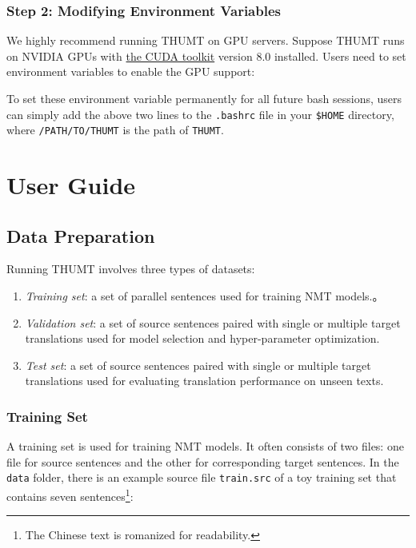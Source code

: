 \documentclass{article}
\begin{document}
\subsubsection{Step 2: Modifying Environment Variables}
We highly recommend running THUMT on GPU servers. Suppose THUMT runs on NVIDIA GPUs with \href{https://developer.nvidia.com/cuda-toolkit}{the CUDA toolkit} version 8.0 installed. Users need to set environment variables to enable the GPU support:

To set these environment variable permanently for all future bash sessions, users can simply add the above two lines to the \verb|.bashrc| file in your \verb|$HOME| directory, where \verb|/PATH/TO/THUMT| is the path of \verb|THUMT|.

\section{User Guide}

\subsection{Data Preparation}
Running THUMT involves three types of datasets:

\begin{enumerate}
\item {\em Training set}: a set of parallel sentences used for training NMT models.。
\item {\em Validation set}: a set of source sentences paired with single or multiple target translations used for model selection and hyper-parameter optimization.
\item {\em Test set}: a set of source sentences paired with single or multiple target translations used for evaluating translation performance on unseen texts.
\end{enumerate}

\subsubsection{Training Set}
A training set is used for training NMT models. It often consists of two files: one file for source sentences and the other for corresponding target sentences. In the \verb|data| folder, there is an example source file \verb|train.src| of a toy training set that contains seven sentences\footnote{The Chinese text is romanized for readability.}:
\end{document}
